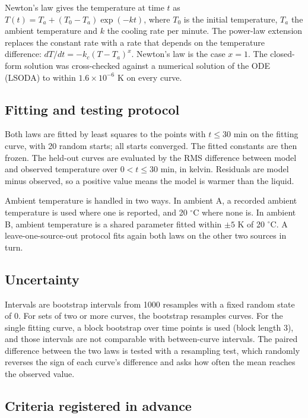 \documentclass[11pt,letterpaper]{article}
\begin{document}
Newton's law gives the temperature at time $t$ as $T(t) = T_a + (T_0 - T_a)\exp(-k t)$, where $T_0$ is the initial temperature, $T_a$ the ambient temperature and $k$ the cooling rate per minute. The power-law extension replaces the constant rate with a rate that depends on the temperature difference: $dT/dt = -k_c (T - T_a)^x$. Newton's law is the case $x = 1$. The closed-form solution was cross-checked against a numerical solution of the ODE (LSODA) to within $1.6\times10^{-6}$ K on every curve.

\subsection{Fitting and testing protocol}

Both laws are fitted by least squares to the points with $t \le 30$ min on the fitting curve, with 20 random starts; all starts converged. The fitted constants are then frozen. The held-out curves are evaluated by the RMS difference between model and observed temperature over $0 < t \le 30$ min, in kelvin. Residuals are model minus observed, so a positive value means the model is warmer than the liquid.

Ambient temperature is handled in two ways. In ambient A, a recorded ambient temperature is used where one is reported, and 20 $^\circ$C where none is. In ambient B, ambient temperature is a shared parameter fitted within $\pm 5$ K of 20 $^\circ$C. A leave-one-source-out protocol fits again both laws on the other two sources in turn.

\subsection{Uncertainty}

Intervals are bootstrap intervals from 1000 resamples with a fixed random state of 0. For sets of two or more curves, the bootstrap resamples curves. For the single fitting curve, a block bootstrap over time points is used (block length 3), and those intervals are not comparable with between-curve intervals. The paired difference between the two laws is tested with a resampling test, which randomly reverses the sign of each curve's difference and asks how often the mean reaches the observed value.

\subsection{Criteria registered in advance}
\end{document}
